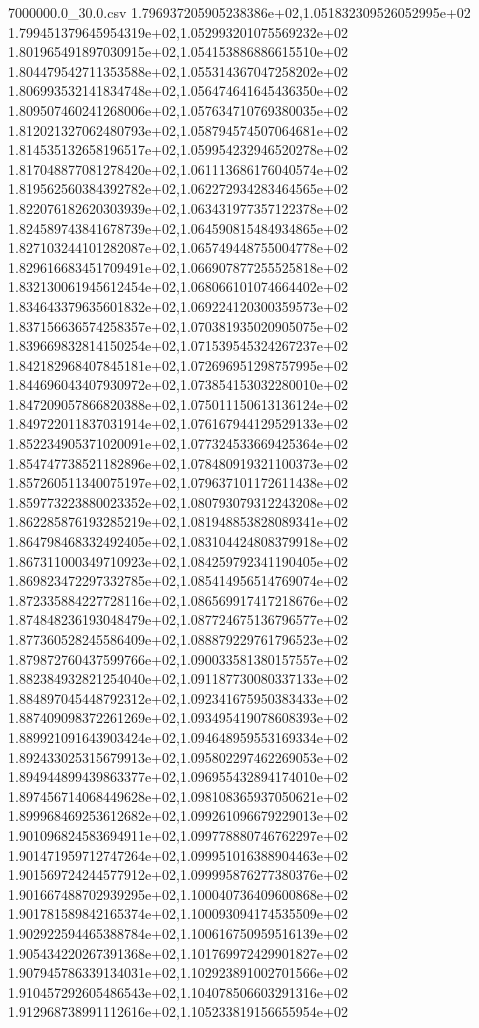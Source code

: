 \begin{filecontents*}{7000000.0_30.0.csv}
1.796937205905238386e+02,1.051832309526052995e+02
1.799451379645954319e+02,1.052993201075569232e+02
1.801965491897030915e+02,1.054153886886615510e+02
1.804479542711353588e+02,1.055314367047258202e+02
1.806993532141834748e+02,1.056474641645436350e+02
1.809507460241268006e+02,1.057634710769380035e+02
1.812021327062480793e+02,1.058794574507064681e+02
1.814535132658196517e+02,1.059954232946520278e+02
1.817048877081278420e+02,1.061113686176040574e+02
1.819562560384392782e+02,1.062272934283464565e+02
1.822076182620303939e+02,1.063431977357122378e+02
1.824589743841678739e+02,1.064590815484934865e+02
1.827103244101282087e+02,1.065749448755004778e+02
1.829616683451709491e+02,1.066907877255525818e+02
1.832130061945612454e+02,1.068066101074664402e+02
1.834643379635601832e+02,1.069224120300359573e+02
1.837156636574258357e+02,1.070381935020905075e+02
1.839669832814150254e+02,1.071539545324267237e+02
1.842182968407845181e+02,1.072696951298757995e+02
1.844696043407930972e+02,1.073854153032280010e+02
1.847209057866820388e+02,1.075011150613136124e+02
1.849722011837031914e+02,1.076167944129529133e+02
1.852234905371020091e+02,1.077324533669425364e+02
1.854747738521182896e+02,1.078480919321100373e+02
1.857260511340075197e+02,1.079637101172611438e+02
1.859773223880023352e+02,1.080793079312243208e+02
1.862285876193285219e+02,1.081948853828089341e+02
1.864798468332492405e+02,1.083104424808379918e+02
1.867311000349710923e+02,1.084259792341190405e+02
1.869823472297332785e+02,1.085414956514769074e+02
1.872335884227728116e+02,1.086569917417218676e+02
1.874848236193048479e+02,1.087724675136796577e+02
1.877360528245586409e+02,1.088879229761796523e+02
1.879872760437599766e+02,1.090033581380157557e+02
1.882384932821254040e+02,1.091187730080337133e+02
1.884897045448792312e+02,1.092341675950383433e+02
1.887409098372261269e+02,1.093495419078608393e+02
1.889921091643903424e+02,1.094648959553169334e+02
1.892433025315679913e+02,1.095802297462269053e+02
1.894944899439863377e+02,1.096955432894174010e+02
1.897456714068449628e+02,1.098108365937050621e+02
1.899968469253612682e+02,1.099261096679229013e+02
1.901096824583694911e+02,1.099778880746762297e+02
1.901471959712747264e+02,1.099951016388904463e+02
1.901569724244577912e+02,1.099995876277380376e+02
1.901667488702939295e+02,1.100040736409600868e+02
1.901781589842165374e+02,1.100093094174535509e+02
1.902922594465388784e+02,1.100616750959516139e+02
1.905434220267391368e+02,1.101769972429901827e+02
1.907945786339134031e+02,1.102923891002701566e+02
1.910457292605486543e+02,1.104078506603291316e+02
1.912968738991112616e+02,1.105233819156655954e+02

\end{filecontents*}
